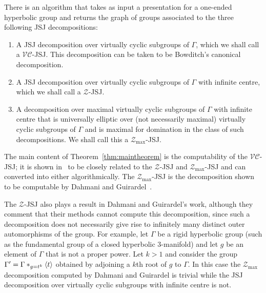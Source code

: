 \begin{thm}\label{thm:maintheorem} There is an algorithm that takes as input a
  presentation for a one-ended hyperbolic group and returns the graph of groups
  associated to the three following JSJ decompositions:
  \begin{enumerate}
    \item A JSJ decomposition over virtually cyclic subgroups of $\Gamma$,
      which we shall call a $\mathcal{VC}$-JSJ. This decomposition can be
      taken to be Bowditch's canonical decomposition.
    \item A JSJ decomposition over virtually cyclic subgroups of $\Gamma$
      with infinite centre, which we shall call a $\mathcal{Z}$-JSJ.
    \item A decomposition over maximal virtually cyclic subgroups of $\Gamma$
      with infinite centre that is universally elliptic over (not necessarily
      maximal) virtually cyclic subgroups of $\Gamma$ and is maximal for
      domination in the class of such decompositions. We shall call this a
      $\mathcal{Z}_\text{max}$-JSJ.
  \end{enumerate}
\end{thm}

The main content of Theorem~\ref{thm:maintheorem} is the computability of the
$\mathcal{VC}$-JSJ; it is shown in~\cite{dahmaniguirardel11} to be closely
related to the $\mathcal{Z}$-JSJ and $\mathcal{Z}_\text{max}$-JSJ and can
converted into either algorithmically. The $\mathcal{Z}_\text{max}$-JSJ is the
decomposition shown to be computable by Dahmani and
Guirardel~\cite{dahmaniguirardel11}.

The $\mathcal{Z}$-JSJ also plays a result in Dahmani and Guirardel's work,
although they comment that their methods cannot compute this decomposition,
since such a decomposition does not necessarily give rise to infinitely many
distinct outer automorphisms of the group.  For example, let $\Gamma$ be a
rigid hyperbolic group (such as the fundamental group of a closed hyperbolic
3-manifold) and let $g$ be an element of $\Gamma$ that is not a proper power.
Let $k > 1$ and consider the group $\Gamma' = \Gamma \ast_{g=t^k} \langle
t\rangle$ obtained by adjoining a $k$th root of $g$ to $\Gamma$. In this case
the $\mathcal{Z}_\text{max}$ decomposition computed by Dahmani and Guirardel is
trivial while the JSJ decomposition over virtually cyclic subgroups with
infinite centre is not. 

